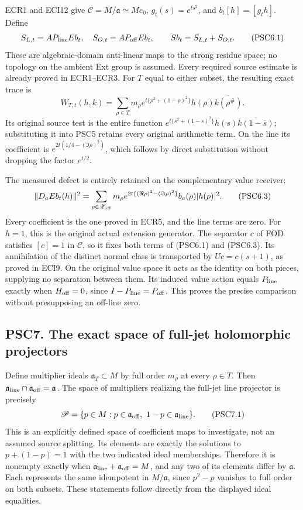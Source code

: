 ECR1 and ECI12 give \(\mathscr C=M/\mathfrak a\simeq Me_0\),
\(g_t(s)=e^{ts^2}\), and \(b_t[h]=[g_th]\). Define \[
S_{L,t}=AP_{\rm line}Eb_t,\quad S_{O,t}=AP_{\rm off}Eb_t,
\qquad Sb_t=S_{L,t}+S_{O,t}.
\tag{PSC6.1}
\] These are algebraic-domain anti-linear maps to the strong residue
space; no topology on the ambient Ext group is assumed. Every required
source estimate is already proved in ECR1--ECR3. For \(T\) equal to
either subset, the resulting exact trace is \[
W_{T,t}(h,k)=\sum_{\rho\in T}m_\rho
e^{t\{\rho^2+(1-\rho)^2\}}h(\rho)\overline{k(\rho^\#)}.
\tag{PSC6.2}
\] Its original source test is the entire function
\(e^{t\{s^2+(1-s)^2\}}h(s)\overline{k(1-\overline s)}\); substituting it
into PSC5 retains every original arithmetic term. On the line its
coefficient is \(e^{2t(1/4-(\Im\rho)^2)}\), which follows by direct
substitution without dropping the factor \(e^{t/2}\).

The measured defect is entirely retained on the complementary value
receiver: \[
\|D_aEb_t(h)\|^2
=\sum_{\rho\in\mathscr Z_{\rm off}}m_\rho
e^{2t\{(\Re\rho)^2-(\Im\rho)^2\}}
b_a(\rho)|h(\rho)|^2.
\tag{PSC6.3}
\] Every coefficient is the one proved in ECR5, and the line terms are
zero. For \(h=1\), this is the original actual extension generator. The
separator \(c\) of FOD satisfies \([c]=1\) in \(\mathscr C\), so it
fixes both terms of (PSC6.1) and (PSC6.3). Its annihilation of the
distinct normal class is transported by \(Uc=c(s+1)\), as proved in
ECI9. On the original value space it acts as the identity on both
pieces, supplying no separation between them. Its induced value action
equals \(P_{\rm line}\) exactly when \(H_{\rm off}=0\), since
\(I-P_{\rm line}=P_{\rm off}\). This proves the precise comparison
without presupposing an off-line zero.

\subsection{PSC7. The exact space of full-jet holomorphic
projectors}\label{psc7.-the-exact-space-of-full-jet-holomorphic-projectors}

Define multiplier ideals \(\mathfrak a_T\subset M\) by full order
\(m_\rho\) at every \(\rho\in T\). Then
\(\mathfrak a_{\rm line}\cap\mathfrak a_{\rm off}=\mathfrak a\). The
space of multipliers realizing the full-jet line projector is precisely
\[
\mathscr P=\{p\in M:p\in\mathfrak a_{\rm off},\ 1-p\in\mathfrak a_{\rm line}\}.
\tag{PSC7.1}
\] This is an explicitly defined space of coefficient maps to
investigate, not an assumed source splitting. Its elements are exactly
the solutions to \(p+(1-p)=1\) with the two indicated ideal memberships.
Therefore it is nonempty exactly when
\(\mathfrak a_{\rm line}+\mathfrak a_{\rm off}=M\), and any two of its
elements differ by \(\mathfrak a\). Each represents the same idempotent
in \(M/\mathfrak a\), since \(p^2-p\) vanishes to full order on both
subsets. These statements follow directly from the displayed ideal
equalities.

